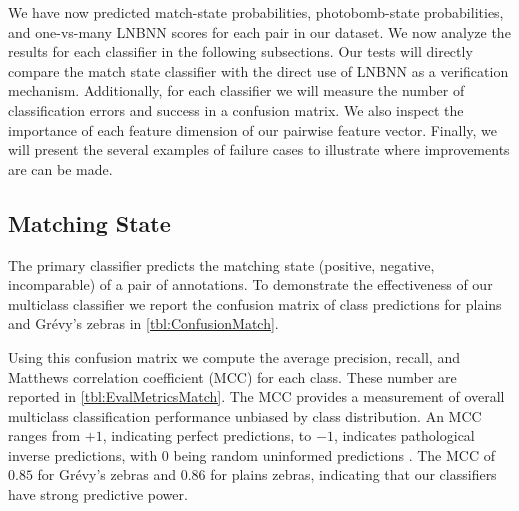     We have now predicted match-state probabilities, photobomb-state probabilities, and one-vs-many LNBNN scores
      for each pair in our dataset.
    We now analyze the results for each classifier in the following subsections.
    Our tests will directly compare the match state classifier with the direct use of LNBNN as a verification
      mechanism.
    Additionally, for each classifier we will measure the number of classification errors and success in a
      confusion matrix.
    We also inspect the importance of each feature dimension of our pairwise feature vector.
    Finally, we will present the several examples of failure cases to illustrate where improvements are can be
      made.




    \subsection{Matching State}

        The primary classifier predicts the matching state (positive, negative, incomparable) of a pair of
          annotations.
        To demonstrate the effectiveness of our multiclass classifier we report the confusion matrix of class
          predictions for plains and Grévy's zebras in \cref{tbl:ConfusionMatch}.

        \ConfusionMatch{}

        \EvalMetricsMatch{}

        Using this confusion matrix we compute the average precision, recall, and Matthews correlation
          coefficient (MCC) for each class.
        These number are reported in \cref{tbl:EvalMetricsMatch}.
        The MCC provides a measurement of overall multiclass classification performance unbiased by class
          distribution.
        An MCC ranges from $+1$, indicating perfect predictions, to $-1$, indicates pathological inverse
          predictions, with $0$ being random uninformed predictions \cite{powers_evaluation_2011}.
        The MCC of $0.85$ for Grévy's zebras and $0.86$ for plains zebras, indicating that our classifiers have
          strong predictive power.
        

